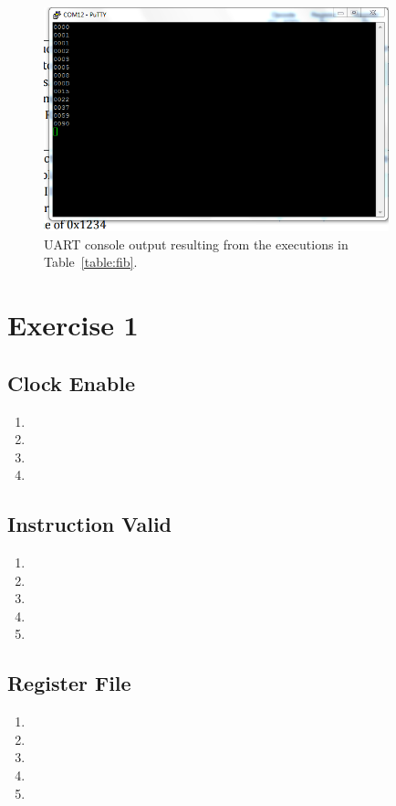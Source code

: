 \documentclass[]{article}
\begin{document}
\begin{figure}[H]
\centering
\includegraphics[width=10cm]{fib.PNG}
\caption{UART console output resulting from the executions in Table~\ref{table:fib}.}
\end{figure}

\section{Exercise 1}


\subsection{Clock Enable}
\begin{enumerate}
\item 
\item 
\item 
\item 
\end{enumerate}
\subsection{Instruction Valid}
\begin{enumerate}
\item 
\item 
\item 
\item 
\item 
\end{enumerate}
\subsection{Register File}
\begin{enumerate}
\item 
\item 
\item 
\item 
\item 
\end{enumerate}
\end{document}
